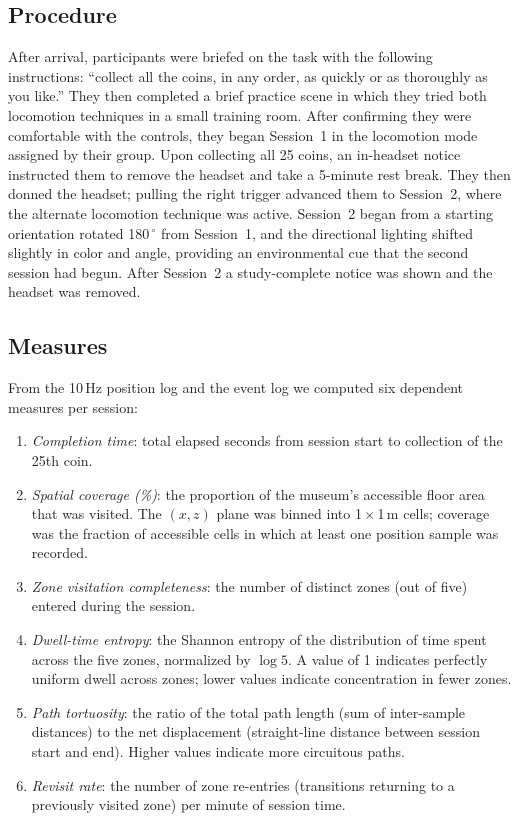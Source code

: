 \documentclass{vgtc}
\begin{document}
\subsection{Procedure}
After arrival, participants were briefed on the task with the following instructions: ``collect all the coins, in any order, as quickly or as thoroughly as you like.'' They then completed a brief practice scene in which they tried both locomotion techniques in a small training room. After confirming they were comfortable with the controls, they began Session~1 in the locomotion mode assigned by their group. Upon collecting all 25 coins, an in-headset notice instructed them to remove the headset and take a 5-minute rest break. They then donned the headset; pulling the right trigger advanced them to Session~2, where the alternate locomotion technique was active. Session~2 began from a starting orientation rotated 180\,$^\circ$ from Session~1, and the directional lighting shifted slightly in color and angle, providing an environmental cue that the second session had begun. After Session~2 a study-complete notice was shown and the headset was removed.

\subsection{Measures}
From the 10\,Hz position log and the event log we computed six dependent measures per session:

\begin{enumerate}
\item \emph{Completion time}: total elapsed seconds from session start to collection of the 25th coin.
\item \emph{Spatial coverage (\%)}: the proportion of the museum's accessible floor area that was visited. The $(x, z)$ plane was binned into 1\,$\times$\,1\,m cells; coverage was the fraction of accessible cells in which at least one position sample was recorded.
\item \emph{Zone visitation completeness}: the number of distinct zones (out of five) entered during the session.
\item \emph{Dwell-time entropy}: the Shannon entropy of the distribution of time spent across the five zones, normalized by $\log 5$. A value of 1 indicates perfectly uniform dwell across zones; lower values indicate concentration in fewer zones.
\item \emph{Path tortuosity}: the ratio of the total path length (sum of inter-sample distances) to the net displacement (straight-line distance between session start and end). Higher values indicate more circuitous paths.
\item \emph{Revisit rate}: the number of zone re-entries (transitions returning to a previously visited zone) per minute of session time.
\end{enumerate}
\end{document}
